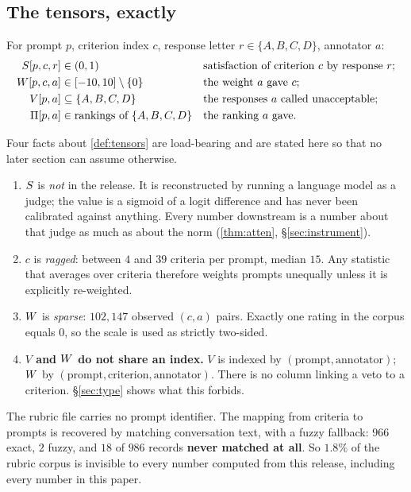 \subsection{The tensors, exactly}

\begin{definition}
\label{def:tensors}
For prompt $p$, criterion index $c$, response letter $r \in \{A,B,C,D\}$,
annotator $a$:
\begin{align*}
S[p,c,r] &\in (0,1) && \text{satisfaction of criterion } c \text{ by response } r;\\
W[p,c,a] &\in [-10,10]\setminus\{0\} && \text{the weight } a \text{ gave } c;\\
V[p,a] &\subseteq \{A,B,C,D\} && \text{the responses } a \text{ called unacceptable};\\
\Pi[p,a] &\in \text{rankings of } \{A,B,C,D\} && \text{the ranking } a \text{ gave.}
\end{align*}
\end{definition}

Four facts about \cref{def:tensors} are load-bearing and are stated here so that
no later section can assume otherwise.

\begin{enumerate}
\item $S$ is \emph{not} in the release. It is reconstructed by running a
      language model as a judge; the value is a sigmoid of a logit difference and
      has never been calibrated against anything. Every number downstream is a
      number about that judge as much as about the norm (\cref{thm:atten},
      §\ref{sec:instrument}).
\item $c$ is \emph{ragged}: between $4$ and $39$ criteria per prompt, median
      $15$. Any statistic that averages over criteria therefore weights prompts
      unequally unless it is explicitly re-weighted.
\item $W$ is \emph{sparse}: $102{,}147$ observed $(c,a)$ pairs. Exactly one
      rating in the corpus equals $0$, so the scale is used as strictly two-sided.
\item \textbf{$V$ and $W$ do not share an index.} $V$ is indexed by
      $(\text{prompt},\text{annotator})$; $W$ by
      $(\text{prompt},\text{criterion},\text{annotator})$. There is no column
      linking a veto to a criterion. §\ref{sec:type} shows what this forbids.
\end{enumerate}

\begin{remark}
The rubric file carries no prompt identifier. The mapping from criteria to
prompts is recovered by matching conversation text, with a fuzzy fallback:
$966$ exact, $2$ fuzzy, and $18$ of $986$ records \textbf{never matched at all}.
So $1.8\%$ of the rubric corpus is invisible to every number computed from this
release, including every number in this paper.
\end{remark}

